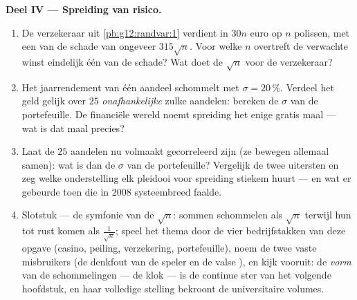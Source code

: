\begin{problem}
\medskip
\noindent\textbf{Deel IV --- Spreiding van risico.}
\begin{enumerate}[resume]
  \item De verzekeraar uit \cref{pb:g12:randvar:1} verdient in
         $30n$ euro op $n$ polissen, met een
         van de schade van ongeveer $315\sqrt n$. Voor welke
        $n$ overtreft de verwachte winst eindelijk één  van
        de schade? Wat doet de $\sqrt n$ voor de verzekeraar?
  \item Het jaarrendement van één aandeel schommelt met $\sigma = 20\,\%$.
        Verdeel het geld gelijk over $25$ \emph{onafhankelijke} zulke
        aandelen: bereken de $\sigma$ van de portefeuille. De financiële
        wereld noemt spreiding het enige gratis maal --- wat is dat maal
        precies?
  \item Laat de $25$ aandelen nu volmaakt gecorreleerd zijn (ze bewegen
        allemaal samen): wat is dan de $\sigma$ van de portefeuille? Vergelijk
        de twee uitersten en zeg welke onderstelling elk pleidooi voor
        spreiding stiekem huurt --- en wat er gebeurde toen die in 2008
        systeembreed faalde.
  \item Slotstuk --- de symfonie van de $\sqrt n$: sommen schommelen als
        $\sqrt n$ terwijl hun  tot rust komen als
        $\frac{1}{\sqrt n}$; speel het thema door de vier bedrijfstakken van
        deze opgave (casino, peiling, verzekering, portefeuille), noem de twee
        vaste misbruikers (de denkfout van de speler en de valse
        ), en kijk vooruit: de \emph{vorm} van de
        schommelingen --- de klok --- is de continue ster van het volgende
        hoofdstuk, en haar volledige stelling bekroont de universitaire
        volumes.
\end{enumerate}
\end{problem}
